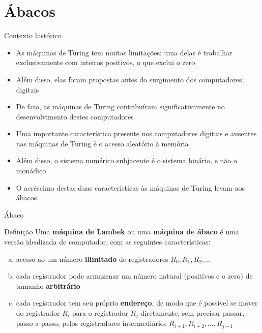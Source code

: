 \section{Ábacos}

\begin{frame}[fragile]{Contexto histórico}

    \begin{itemize}
        \item As máquinas de Turing tem muitas limitações: uma delas é trabalhar exclusivamente
            com inteiros positivos, o que exclui o zero

        \item Além disso, elas foram propostas antes do surgimento dos computadores digitais

        \item De fato, as máquinas de Turing contribuíram significativamente no desenvolvimento
            destes computadores

        \item Uma importante característica presente nos computadores digitais e ausentes nas
            máquinas de Turing é o acesso aleatório à memória

        \item Além disso, o sistema numérico subjacente é o sistema binário, e não o monádico

        \item O acréscimo destas duas características às máquinas de Turing levam aos ábacos
    \end{itemize}

\end{frame}

\begin{frame}[fragile]{Ábaco}

    \begin{block}{Definição}
        Uma \textbf{máquina de Lambek} ou uma \textbf{máquina de ábaco} é uma versão idealizada
        de computador, com as seguintes características:
        \begin{enumerate}[(a)]
            \item acesso ao um número \textbf{ilimitado} de registradores $R_0, R_1, R_2, \ldots$
            \item cada registrador pode armazenar um número natural (positivos e o zero) de tamanho
                \textbf{arbitrário}
            \item cada registrador tem seu próprio \textbf{endereço}, de modo que é possível se 
                mover do registrador $R_i$ para o registrador $R_j$ diretamente, sem precisar 
                passar, passo a passo, pelos registradores intermediários 
                $R_{i + 1}, R_{i + 2}, \ldots, R_{j - 1}$
        \end{enumerate}
    \end{block}

\end{frame}

